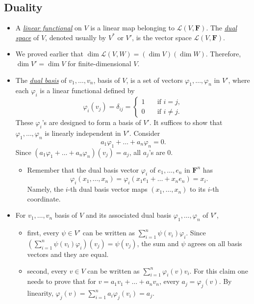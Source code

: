 \documentclass{article}
\newcommand{\df}[1]{\ul{\textit{#1}}}
\newcommand{\F}{\mathbf{F}}
\renewcommand{\d}{\dim}
\newcommand{\LVW}{\mathcal{L}(V,W)}
\renewcommand{\phi}{\varphi}
\begin{document}
\subsection{Duality}
\begin{itemize}
    \item A \df{linear functional} on $V$ is a linear map belonging to $\mathcal{L}(V,\F)$. The \df{dual space} of $V$, denoted usually by $V^*$ or $V'$, is the vector space $\mathcal{L}(V,\F)$.
    \item We proved earlier that $\d \LVW = (\d V)(\d W)$. Therefore, $\d V' = \d V$ for finite-dimensional $V$.
    \item The \df{dual basis} of $v_1,\dots,v_n$, basis of $V$, is a set of vectors $\phi_1,\dots,\phi_n$ in $V'$, where each $\phi_i$ is a linear functional defined by
    \begin{equation*}
        \phi_i(v_j) = \delta_{ij} = \left\{
            \begin{array}{rl}
                1 \quad & \text{if } i = j, \\
                0 \quad & \text{if } i \not= j.
            \end{array}
        \right.
    \end{equation*}
    These $\phi_i$'s are designed to form a basis of $V'$. It suffices to show that $\phi_1,\dots,\phi_n$ is linearly independent in $V'$. Consider $$a_1\phi_1+\dots+a_n\phi_n=0.$$ Since $(a_1\phi_1+\dots+a_n\phi_n)(v_j)=a_j$, all $a_j$'s are 0.
    \begin{itemize}
        \item Remember that the dual basis vector $\phi_i$ of $e_1,\dots,e_n$ in $\F^n$ has $$\phi_i(x_1,\dots,x_n)=\phi_i(x_1e_1+\dots+x_ne_n)=x_i.$$ Namely, the $i$-th dual basis vector maps $(x_1,\dots,x_n)$ to its $i$-th coordinate.
    \end{itemize}
    \item For $v_1,\dots,v_n$ basis of $V$ and its associated dual basis $\phi_1,\dots,\phi_n$ of $V'$, 
    \begin{itemize}
        \item first, every $\psi \in V'$ can be written as $\sum_{i=1}^n \psi(v_i)\phi_i$. Since $(\sum_{i=1}^n \psi(v_i)\phi_i)(v_j) = \psi(v_j)$, the sum and $\psi$ agrees on all basis vectors and they are equal.
        \item second, every $v \in V$ can be written as $\sum_{i=1}^n \phi_i(v)v_i$. For this claim one needs to prove that for $v = a_1v_1 + \dots +a_nv_n$, every $a_j = \phi_j(v)$. By linearity, $\phi_j(v) = \sum_{i=1}^n a_i \phi_j(v_i) = a_j$.

\end{itemize}
\end{itemize}
\end{document}
